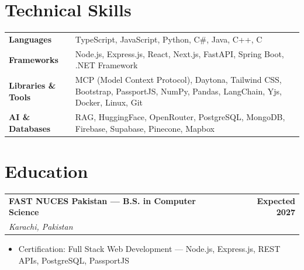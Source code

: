 \documentclass[letterpaper,10pt]{article}
\makeatletter
\newcommand{\ROLEBEFORE}{0pt}\newcommand{\ROLEAFTER}{1.5pt}
\newcommand{\role}[3]{%
  \vspace{\ROLEBEFORE}\begin{tabular*}{\textwidth}{l@{\extracolsep{\fill}}r}
    \textbf{#1} & \textbf{#2} \\
    \textit{#3} & \\
  \end{tabular*}\vspace{\ROLEAFTER}}
\makeatother
\begin{document}
\section{Technical Skills}
\begin{tabularx}{\textwidth}{@{}p{1.36in}X@{}}
  \textbf{Languages} & TypeScript, JavaScript, Python, C\#, Java, C++, C \\[1.2pt]
  \textbf{Frameworks} & Node.js, Express.js, React, Next.js, FastAPI, Spring Boot, .NET Framework \\[1.2pt]
  \textbf{Libraries \& Tools} & MCP (Model Context Protocol), Daytona, Tailwind CSS, Bootstrap, PassportJS, NumPy, Pandas, LangChain, Yjs, Docker, Linux, Git \\[1.2pt]
  \textbf{AI \& Databases} & RAG, HuggingFace, OpenRouter, PostgreSQL, MongoDB, Firebase, Supabase, Pinecone, Mapbox \\[1.2pt]
\end{tabularx}

\section{Education}
\role{FAST NUCES Pakistan --- B.S. in Computer Science}{Expected 2027}{Karachi, Pakistan}
\begin{itemize}
  \item Certification: Full Stack Web Development --- Node.js, Express.js, REST APIs, PostgreSQL, PassportJS
\end{itemize}
\end{document}
